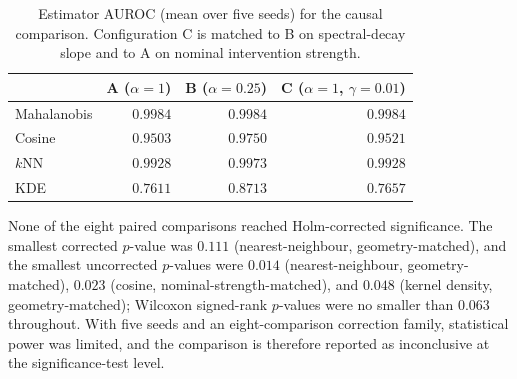 \begin{table}[!t]
\caption{Estimator AUROC (mean over five seeds) for the causal comparison.
Configuration C is matched to B on spectral-decay slope and to A on nominal
intervention strength.}
\label{tab:c3}
\centering
\begin{tabular}{lrrr}
\toprule
 & A ($\alpha{=}1$) & B ($\alpha{=}0.25$) & C ($\alpha{=}1$, $\gamma{=}0.01$) \\
\midrule
Mahalanobis & $0.9984$ & $0.9984$ & $0.9984$ \\
Cosine      & $0.9503$ & $0.9750$ & $0.9521$ \\
$k$NN       & $0.9928$ & $0.9973$ & $0.9928$ \\
KDE         & $0.7611$ & $0.8713$ & $0.7657$ \\
\bottomrule
\end{tabular}
\end{table}

None of the eight paired comparisons reached Holm-corrected significance. The
smallest corrected $p$-value was $0.111$ (nearest-neighbour,
geometry-matched), and the smallest uncorrected $p$-values were $0.014$
(nearest-neighbour, geometry-matched), $0.023$ (cosine,
nominal-strength-matched), and $0.048$ (kernel density, geometry-matched);
Wilcoxon signed-rank $p$-values were no smaller than $0.063$ throughout. With
five seeds and an eight-comparison correction family, statistical power was
limited, and the comparison is therefore reported as inconclusive at the
significance-test level.
